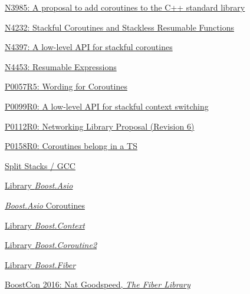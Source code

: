 \begin{thebibliography}{99}

        \href{http://www.open-std.org/jtc1/sc22/wg21/docs/papers/2014/n3985.pdf}
        {N3985: A proposal to add coroutines to the C++ standard library}

        \href{http://www.open-std.org/jtc1/sc22/wg21/docs/papers/2014/n4232.pdf}
        {N4232: Stackful Coroutines and Stackless Resumable Functions}

        \href{http://www.open-std.org/jtc1/sc22/wg21/docs/papers/2015/n4397.pdf}
        {N4397: A low-level API for stackful coroutines}

        \href{http://www.open-std.org/jtc1/sc22/wg21/docs/papers/2015/n4453.pdf}
        {N4453: Resumable Expressions}

        \href{http://www.open-std.org/jtc1/sc22/wg21/docs/papers/2016/p0057r5.pdf}
        {P0057R5: Wording for Coroutines}

        \href{http://www.open-std.org/jtc1/sc22/wg21/docs/papers/2015/p0099r0.pdf}
        {P0099R0: A low-level API for stackful context switching}

        \href{http://www.open-std.org/jtc1/sc22/wg21/docs/papers/2015/p0112r0.html}
        {P0112R0: Networking Library Proposal (Revision 6)}

        \href{http://www.open-std.org/jtc1/sc22/wg21/docs/papers/2015/p0158r0.html}
        {P0158R0: Coroutines belong in a TS}

        \href{http://gcc.gnu.org/wiki/SplitStacks}
        {Split Stacks / GCC}

        \href{http://www.boost.org/doc/libs/release/doc/html/boost\_asio.html}
        {Library \emph{Boost.Asio}}

        \href{http://www.boost.org/doc/libs/release/doc/html/boost_asio/reference/coroutine.html}
        {\emph{Boost.Asio} Coroutines}

        \href{http://www.boost.org/doc/libs/release/libs/context/doc/html/index.html}
        {Library \emph{Boost.Context}}

        \href{http://www.boost.org/doc/libs/release/libs/coroutine2/doc/html/index.html}
        {Library \emph{Boost.Coroutine2}}

        \href{http://www.boost.org/doc/libs/release/libs/fiber/doc/html/index.html}
        {Library \emph{Boost.Fiber}}

        \href{https://www.youtube.com/watch?v=gcNphOWuUb0}
        {BoostCon 2016: Nat Goodspeed, \emph{The Fiber Library}}

\end{thebibliography}
